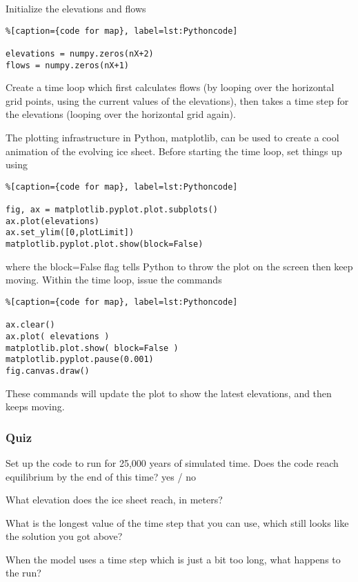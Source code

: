 Initialize the elevations and flows


\begin{lstlisting}%[caption={code for map}, label=lst:Pythoncode]

elevations = numpy.zeros(nX+2)
flows = numpy.zeros(nX+1)
\end{lstlisting}

Create a time loop which first calculates flows (by looping over the horizontal grid points, using the current values of the elevations), then takes a time step for the elevations (looping over the horizontal grid again).

The plotting infrastructure in Python, matplotlib, can be used to create a cool animation of the evolving ice sheet. Before starting the time loop, set things up using


\begin{lstlisting}%[caption={code for map}, label=lst:Pythoncode]

fig, ax = matplotlib.pyplot.plot.subplots()
ax.plot(elevations)
ax.set_ylim([0,plotLimit])
matplotlib.pyplot.plot.show(block=False)
\end{lstlisting}

where the block=False flag tells Python to throw the plot on the screen then keep moving. Within the time loop, issue the commands

\begin{lstlisting}%[caption={code for map}, label=lst:Pythoncode]

ax.clear()
ax.plot( elevations )
matplotlib.plot.show( block=False )
matplotlib.pyplot.pause(0.001)
fig.canvas.draw()
\end{lstlisting}

These commands will update the plot to show the latest elevations, and then keeps moving.


\subsubsection{Quiz}\index{}
Set up the code to run for 25,000 years of simulated time. Does the code reach equilibrium by the end of this time?  
yes / no

What elevation does the ice sheet reach, in meters?


What is the longest value of the time step that you can use, which still looks like the solution you got above?


When the model uses a time step which is just a bit too long, what happens to the run?

